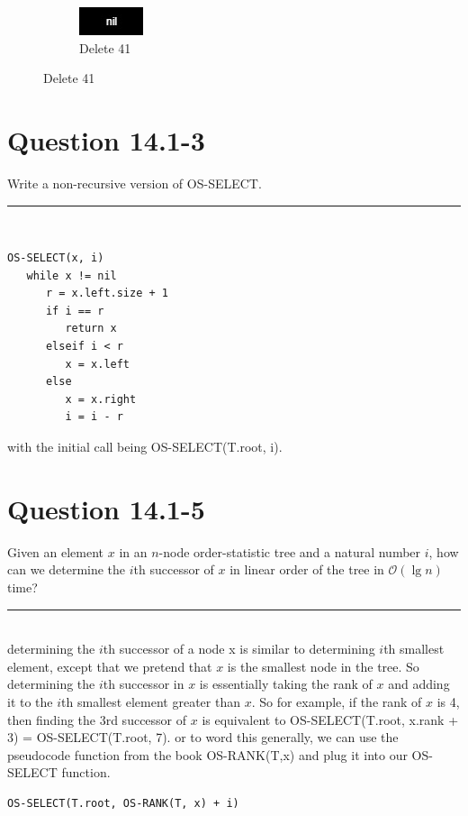 \documentclass[20pt]{article} %
\begin{document}
\begin{figure}[!htbp]
  	\begin{subfigure}[p]{0.4\linewidth}
    	\includegraphics[width=\linewidth]{a7.jpg}
    	\caption{Delete 41}
  	\end{subfigure}

\end{figure}

\newpage
\newpage
\newpage
\newpage
\section{Question 14.1-3}
Write a non-recursive version of OS-SELECT. \\
\noindent\rule{2cm}{0.4pt} \\

\begin{verbatim}
OS-SELECT(x, i)
   while x != nil
      r = x.left.size + 1
      if i == r
         return x
      elseif i < r
         x = x.left
      else 
         x = x.right
         i = i - r
\end{verbatim}

with the initial call being OS-SELECT(T.root, i).



\section{Question 14.1-5}
Given an element $x$ in an $n$-node order-statistic tree and a natural number $i$, how can we determine the $i$th successor of $x$ in linear order of the tree in $\mathcal{O}(\lg n)$ time? \\
\noindent\rule{2cm}{0.4pt} \\

determining the $i$th successor of a node x is similar to determining $i$th smallest element, except that we pretend that $x$ is the smallest node in the tree.  So determining the $i$th successor in $x$ is essentially taking the rank of $x$ and adding it to the $i$th smallest element greater than $x$.  So for example, if the rank of $x$ is 4, then finding the 3rd successor of $x$ is equivalent to OS-SELECT(T.root, x.rank + 3) = OS-SELECT(T.root, 7). or to word this generally, we can use the pseudocode function from the book OS-RANK(T,x) and plug it into our OS-SELECT function.
\begin{verbatim}
OS-SELECT(T.root, OS-RANK(T, x) + i)
\end{verbatim}
\end{document}

